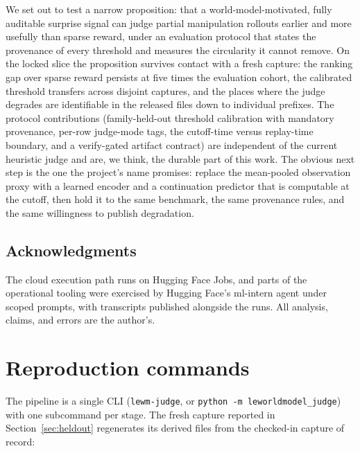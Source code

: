 \documentclass[11pt]{article}
\begin{document}
We set out to test a narrow proposition: that a world-model-motivated, fully auditable
surprise signal can judge partial manipulation rollouts earlier and more usefully than
sparse reward, under an evaluation protocol that states the provenance of every threshold
and measures the circularity it cannot remove. On the locked slice the proposition survives contact with a fresh capture: the
ranking gap over sparse reward persists at five times the evaluation cohort, the calibrated
threshold transfers across disjoint captures, and the places where the judge degrades are
identifiable in the released files down to individual prefixes. The protocol contributions
(family-held-out threshold calibration with mandatory provenance, per-row judge-mode tags,
the cutoff-time versus replay-time boundary, and a verify-gated artifact contract) are
independent of the current heuristic judge and are, we think, the durable part of this
work. The obvious next step is the one the project's name promises: replace the mean-pooled
observation proxy with a learned encoder and a continuation predictor that is computable at
the cutoff, then hold it to the same benchmark, the same provenance rules, and the same
willingness to publish degradation.

\subsection*{Acknowledgments}

The cloud execution path runs on Hugging Face Jobs, and parts of the operational tooling
were exercised by Hugging Face's ml-intern agent under scoped prompts, with transcripts
published alongside the runs. All analysis, claims, and errors are the author's.




\appendix

\section{Reproduction commands}
\label{app:repro}

The pipeline is a single CLI (\texttt{lewm-judge}, or \texttt{python -m leworldmodel\_judge})
with one subcommand per stage. The fresh capture reported in Section~\ref{sec:heldout}
regenerates its derived files from the checked-in capture of record:
\end{document}
